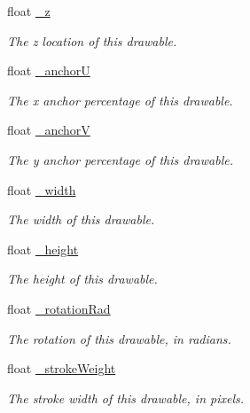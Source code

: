 \begin{DoxyCompactItemize}
float \hyperlink{classhype_1_1core_1_1drawable_1_1_h_drawable_ad66aec98221c2988eda1ffb4310ca72a}{\-\_\-z}
\begin{DoxyCompactList}\small\item\em The z location of this drawable. \end{DoxyCompactList}\item 
float \hyperlink{classhype_1_1core_1_1drawable_1_1_h_drawable_a57c2089cf2b6d7621844cbc9814c3e51}{\-\_\-anchor\-U}
\begin{DoxyCompactList}\small\item\em The x anchor percentage of this drawable. \end{DoxyCompactList}\item 
float \hyperlink{classhype_1_1core_1_1drawable_1_1_h_drawable_aeb7e6b74ab55ac95fd49d86a4fce5d48}{\-\_\-anchor\-V}
\begin{DoxyCompactList}\small\item\em The y anchor percentage of this drawable. \end{DoxyCompactList}\item 
float \hyperlink{classhype_1_1core_1_1drawable_1_1_h_drawable_a1a040597d04986d5378b477453d987e4}{\-\_\-width}
\begin{DoxyCompactList}\small\item\em The width of this drawable. \end{DoxyCompactList}\item 
float \hyperlink{classhype_1_1core_1_1drawable_1_1_h_drawable_ac4171079b3f6831d4f982ad2ae6363ce}{\-\_\-height}
\begin{DoxyCompactList}\small\item\em The height of this drawable. \end{DoxyCompactList}\item 
float \hyperlink{classhype_1_1core_1_1drawable_1_1_h_drawable_a5489140987809e738b74139cfa0e7583}{\-\_\-rotation\-Rad}
\begin{DoxyCompactList}\small\item\em The rotation of this drawable, in radians. \end{DoxyCompactList}\item 
float \hyperlink{classhype_1_1core_1_1drawable_1_1_h_drawable_ae27cfc0ffd6a6c5e8d44a1b7f017f157}{\-\_\-stroke\-Weight}
\begin{DoxyCompactList}\small\item\em The stroke width of this drawable, in pixels. \end{DoxyCompactList}\item 

\end{DoxyCompactItemize}
